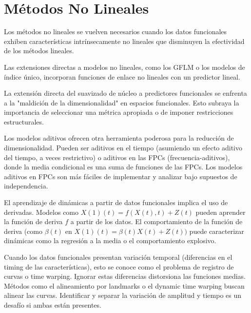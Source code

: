 \documentclass{article}
\begin{document}
\section*{\large Métodos No Lineales}
Los métodos no lineales se vuelven necesarios cuando los datos funcionales exhiben características intrínsecamente no lineales que disminuyen la efectividad de los métodos lineales.

\vspace{0.35cm}\noindent
Las extensiones directas a modelos no lineales, como los GFLM o los modelos de índice único, incorporan funciones de enlace no lineales con un predictor lineal.

\vspace{0.35cm}\noindent
La extensión directa del suavizado de núcleo a predictores funcionales se enfrenta a la "maldición de la dimensionalidad" en espacios funcionales. Esto subraya la importancia de seleccionar una métrica apropiada o de imponer restricciones estructurales.

\vspace{0.35cm}\noindent
Los modelos aditivos ofrecen otra herramienta poderosa para la reducción de dimensionalidad. Pueden ser aditivos en el tiempo (asumiendo un efecto aditivo del tiempo, a veces restrictivo) o aditivos en las FPCs (frecuencia-aditivos), donde la media condicional es una suma de funciones de las FPCs. Los modelos aditivos en FPCs son más fáciles de implementar y analizar bajo supuestos de independencia.

\vspace{0.35cm}\noindent
El aprendizaje de dinámicas a partir de datos funcionales implica el uso de derivadas. Modelos como $X(1)(t) = f(X(t), t) + Z(t)$ pueden aprender la función de deriva $f$ a partir de los datos. El comportamiento de la función de deriva (como $\beta(t)$ en $X(1)(t) = \beta(t)X(t) + Z(t))$ puede caracterizar dinámicas como la regresión a la media o el comportamiento explosivo.

\vspace{0.35cm}\noindent
Cuando los datos funcionales presentan variación temporal (diferencias en el timing de las características), esto se conoce como el problema de registro de curvas o time warping. Ignorar estas diferencias distorsiona las funciones medias. Métodos como el alineamiento por landmarks o el dynamic time warping buscan alinear las curvas. Identificar y separar la variación de amplitud y tiempo es un desafío si ambas están presentes.
\end{document}
